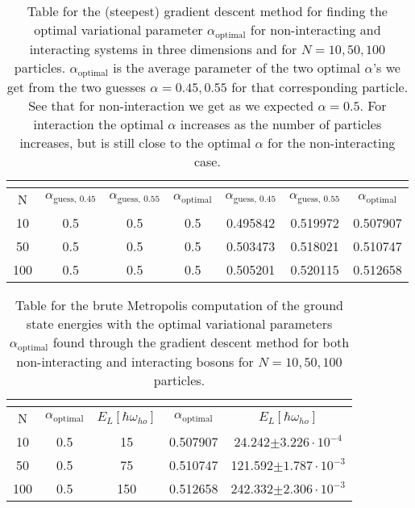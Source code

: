 \documentclass[12pt,a4paper,english]{article}
\begin{document}
\begin{table}[htbp!]
	\centering
	\begin{tabular}{ |c|c|c|c|c|c|c| }
		\hline \rule{0pt}{13pt}
		\text{System} & \multicolumn{3}{c|}{\text{Non-interacting}}  & \multicolumn{3}{c|}{\text{Interacting}}\\
		\hline \rule{0pt}{13pt}
		N & $\alpha_{\text{guess, 0.45}}$ & $\alpha_{\text{guess, 0.55}}$ & $\alpha_{\text{optimal}}$ & $\alpha_{\text{guess, 0.45}}$ & $\alpha_{\text{guess, 0.55}}$ & $\alpha_{\text{optimal}}$  \\
		\hline \rule{0pt}{13pt}
		10 & 0.5 & 0.5 & 0.5 & 0.495842 & 0.519972 & 0.507907 \\
		\hline \rule{0pt}{13pt}
		50 & 0.5 & 0.5 & 0.5 & 0.503473 & 0.518021 & 0.510747 \\
		\hline \rule{0pt}{13pt}
		100 & 0.5 & 0.5 & 0.5 & 0.505201 & 0.520115 & 0.512658 \\
		\hline
	\end{tabular}	
	\caption{Table for the (steepest) gradient descent method for finding the optimal variational parameter $\alpha_{\text{optimal}}$ for non-interacting and interacting systems in three dimensions and for $N=10,50,100$ particles. $\alpha_{\text{optimal}}$ is the average parameter of the two optimal $\alpha$'s we get from the two guesses $\alpha=0.45,0.55$ for that corresponding particle. See that for non-interaction we get as we expected $\alpha=0.5$. For interaction the optimal $\alpha$ increases as the number of particles increases, but is still close to the optimal $\alpha$ for the non-interacting case. \label{tab:gradient}}
\end{table}

\begin{table}[htbp!]
	\centering
	\begin{tabular}{ |c|c|c|c|c| }
		\hline \rule{0pt}{13pt}
		\text{System} & \multicolumn{2}{c|}{\text{Non-interacting}}  & \multicolumn{2}{c|}{\text{Interacting}} \\
		\hline \rule{0pt}{13pt}
		N &  $\alpha_{\text{optimal}}$ & $E_L[\hbar\omega_{ho}]$ & $\alpha_{\text{optimal}}$ & $E_L[\hbar\omega_{ho}]$ \\
		\hline \rule{0pt}{13pt}
		10 & 0.5 & 15 & 0.507907 & 24.242$\pm3.226\cdot10^{-4}$ \\
		\hline \rule{0pt}{13pt}
		50 & 0.5 & 75 & 0.510747 & 121.592$\pm1.787\cdot10^{-3}$ \\
		\hline \rule{0pt}{13pt}
		100 & 0.5 & 150 & 0.512658 & 242.332$\pm2.306\cdot10^{-3}$ \\
		\hline
	\end{tabular}	
	\caption{Table for the brute Metropolis computation of the ground state energies with the optimal variational parameters $\alpha_{\text{optimal}}$ found through the gradient descent method for both non-interacting and interacting bosons for $N=10,50,100$ particles. \label{tab:optimal_alpha_grad}}
\end{table}
\end{document}
